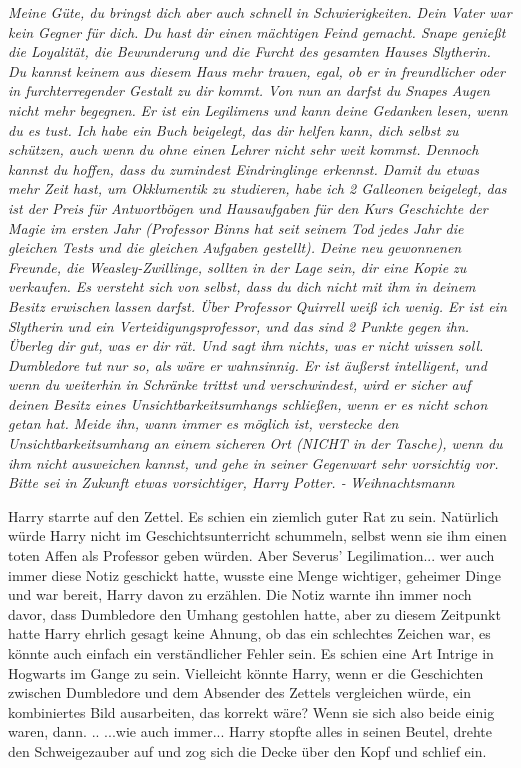 \emph{Meine Güte, du bringst dich aber auch schnell in Schwierigkeiten. Dein
Vater war kein Gegner für dich. } \emph{Du hast dir einen mächtigen Feind
gemacht. Snape genießt die Loyalität, die Bewunderung und die Furcht des
gesamten Hauses Slytherin. Du kannst keinem aus diesem Haus mehr trauen, egal,
ob er in freundlicher oder in furchterregender Gestalt zu dir kommt. Von nun an
darfst du Snapes Augen nicht mehr begegnen. } \emph{Er ist ein Legilimens und
kann deine Gedanken lesen, wenn du es tust. Ich habe ein Buch beigelegt, das dir
helfen kann, dich selbst zu schützen, auch wenn du ohne einen Lehrer nicht sehr
weit kommst. Dennoch kannst du hoffen, dass du zumindest Eindringlinge erkennst.
Damit du etwas mehr Zeit hast, um Okklumentik zu studieren, habe ich 2 Galleonen
beigelegt, das ist der Preis für Antwortbögen und Hausaufgaben für den Kurs
Geschichte der Magie im ersten Jahr (Professor Binns hat seit seinem Tod jedes
Jahr die gleichen Tests und die gleichen Aufgaben gestellt). Deine neu
gewonnenen Freunde, die Weasley-Zwillinge, sollten in der Lage sein, dir eine
Kopie zu verkaufen. Es versteht sich von selbst, dass du dich nicht mit ihm in
deinem Besitz erwischen lassen darfst. Über Professor Quirrell weiß ich wenig.
Er ist ein Slytherin und ein Verteidigungsprofessor, und das sind 2 Punkte gegen
ihn. Überleg dir gut, was er dir rät. Und sagt ihm nichts, was er nicht wissen
soll. } \emph{Dumbledore tut nur so, als wäre er wahnsinnig. Er ist äußerst
intelligent, und wenn du weiterhin in Schränke trittst und verschwindest, wird
er sicher auf deinen Besitz eines Unsichtbarkeitsumhangs schließen, wenn er es
nicht schon getan hat.} \emph{ Meide ihn, wann immer es möglich ist, verstecke
den Unsichtbarkeitsumhang an einem sicheren Ort (NICHT in der Tasche), wenn du
ihm nicht ausweichen kannst, und gehe in seiner Gegenwart sehr vorsichtig vor.
Bitte sei in Zukunft etwas vorsichtiger, Harry Potter. - } \emph{Weihnachtsmann
}

Harry starrte auf den Zettel. Es schien ein ziemlich guter Rat zu sein.
Natürlich würde Harry nicht im Geschichtsunterricht schummeln, selbst wenn sie
ihm einen toten Affen als Professor geben würden. Aber Severus' Legilimation...
wer auch immer diese Notiz geschickt hatte, wusste eine Menge wichtiger,
geheimer Dinge und war bereit, Harry davon zu erzählen. Die Notiz warnte ihn
immer noch davor, dass Dumbledore den Umhang gestohlen hatte, aber zu diesem
Zeitpunkt hatte Harry ehrlich gesagt keine Ahnung, ob das ein schlechtes Zeichen
war, es könnte auch einfach ein verständlicher Fehler sein. Es schien eine Art
Intrige in Hogwarts im Gange zu sein. Vielleicht könnte Harry, wenn er die
Geschichten zwischen Dumbledore und dem Absender des Zettels vergleichen würde,
ein kombiniertes Bild ausarbeiten, das korrekt wäre? Wenn sie sich also beide
einig waren, dann. .. ...wie auch immer... Harry stopfte alles in seinen Beutel,
drehte den Schweigezauber auf und zog sich die Decke über den Kopf und schlief
ein.

